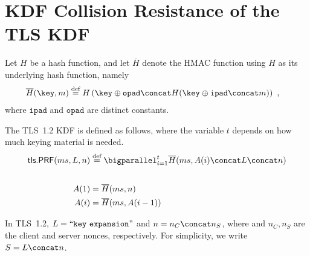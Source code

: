 \newcommand{\M}{\overline{H}}
\newcommand{\padI}{\mathtt{ipad}}
\newcommand{\padO}{\mathtt{opad}}


\section{KDF  Collision Resistance of the TLS KDF}\label{sec:tls.PRF_collision_resistance}
Let $H$ be a hash function,
and let $\M$ denote the HMAC function using $H$ as its underlying hash function,
namely
\begin{align}
	\M(\key, m) &\overset{\text{def}}{=} H \left(\key \oplus \padO \concat H(\key \oplus \padI \concat m) \right) \label{eq:HMAC:def} \ , %
\end{align}
where $\padI$ and $\padO$ are distinct constants.

The TLS~1.2 KDF is defined as follows,
where the variable $t$ depends on how much keying material is needed.
\begin{align}
	\mathsf{tls.PRF}(ms, L, n) &\overset{\text{def}}{=} \bigparallel_{i=1}^t \M(ms, A(i) \concat L \concat n)\label{eq:tls.PRF:def} \\
	 \intertext{}
	 A(1) &= \M(ms, n) \label{eq:A(1):def} \\
	 A(i) &= \M(ms, A(i-1))
\end{align}

In TLS~1.2, $L = ``\mathtt{key\ expansion}"$ and $n = n_C \concat n_S$,
where and $n_C,n_S$ are the client and server nonces,
respectively.
For simplicity, we write $S = L \concat n$.

